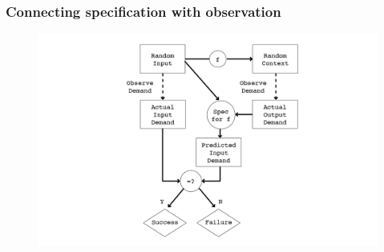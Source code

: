 \documentclass{beamer}
\begin{document}
\begin{frame}[fragile]
\frametitle{Connecting specification with observation}
\begin{figure}
\centering
\includegraphics[width=1.0\textwidth]{specflow}
\end{figure}
\end{frame}

\end{document}
